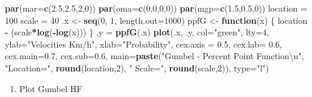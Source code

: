 \documentclass[12pt,twoside]{reedthesis}
\newenvironment{Shaded}{\begin{snugshade}}{\end{snugshade}}
\newcommand{\CharTok}[1]{\textcolor[rgb]{0.31,0.60,0.02}{#1}}
\newcommand{\ControlFlowTok}[1]{\textcolor[rgb]{0.13,0.29,0.53}{\textbf{#1}}}
\newcommand{\DataTypeTok}[1]{\textcolor[rgb]{0.13,0.29,0.53}{#1}}
\newcommand{\DecValTok}[1]{\textcolor[rgb]{0.00,0.00,0.81}{#1}}
\newcommand{\FloatTok}[1]{\textcolor[rgb]{0.00,0.00,0.81}{#1}}
\newcommand{\KeywordTok}[1]{\textcolor[rgb]{0.13,0.29,0.53}{\textbf{#1}}}
\newcommand{\NormalTok}[1]{#1}
\newcommand{\OperatorTok}[1]{\textcolor[rgb]{0.81,0.36,0.00}{\textbf{#1}}}
\newcommand{\StringTok}[1]{\textcolor[rgb]{0.31,0.60,0.02}{#1}}
\providecommand{\tightlist}{%
  \setlength{\itemsep}{0pt}\setlength{\parskip}{0pt}}
\begin{document}
\vspace{0.4cm}
\begin{Shaded}
\begin{Highlighting}[]
\KeywordTok{par}\NormalTok{(}\DataTypeTok{mar=}\KeywordTok{c}\NormalTok{(}\FloatTok{2.5}\NormalTok{,}\FloatTok{2.5}\NormalTok{,}\DecValTok{2}\NormalTok{,}\DecValTok{0}\NormalTok{))}
\KeywordTok{par}\NormalTok{(}\DataTypeTok{oma=}\KeywordTok{c}\NormalTok{(}\DecValTok{0}\NormalTok{,}\DecValTok{0}\NormalTok{,}\DecValTok{0}\NormalTok{,}\DecValTok{0}\NormalTok{))}
\KeywordTok{par}\NormalTok{(}\DataTypeTok{mgp=}\KeywordTok{c}\NormalTok{(}\FloatTok{1.5}\NormalTok{,}\FloatTok{0.5}\NormalTok{,}\DecValTok{0}\NormalTok{))}
\NormalTok{location =}\StringTok{ }\DecValTok{100}
\NormalTok{scale =}\StringTok{ }\DecValTok{40}
\NormalTok{.x <-}\StringTok{ }\KeywordTok{seq}\NormalTok{(}\DecValTok{0}\NormalTok{, }\DecValTok{1}\NormalTok{, }\DataTypeTok{length.out=}\DecValTok{1000}\NormalTok{)}
\NormalTok{ppfG <-}\StringTok{ }\ControlFlowTok{function}\NormalTok{(x) \{}
\NormalTok{  location }\OperatorTok{-}\StringTok{ }\NormalTok{(scale}\OperatorTok{*}\KeywordTok{log}\NormalTok{(}\OperatorTok{-}\KeywordTok{log}\NormalTok{(x)))}
\NormalTok{  \}}
\NormalTok{.y =}\StringTok{ }\KeywordTok{ppfG}\NormalTok{(.x)}
\KeywordTok{plot}\NormalTok{(.x, .y, }\DataTypeTok{col=}\StringTok{"green"}\NormalTok{, }\DataTypeTok{lty=}\DecValTok{4}\NormalTok{, }\DataTypeTok{ylab=}\StringTok{"Velocities Km/h"}\NormalTok{, }\DataTypeTok{xlab=}\StringTok{"Probability"}\NormalTok{, }\DataTypeTok{cex.axis =} \FloatTok{0.5}\NormalTok{, }\DataTypeTok{cex.lab=} \FloatTok{0.6}\NormalTok{, }\DataTypeTok{cex.main=}\FloatTok{0.7}\NormalTok{, }\DataTypeTok{cex.sub=}\FloatTok{0.6}\NormalTok{,}
 \DataTypeTok{main=}\KeywordTok{paste}\NormalTok{(}\StringTok{"Gumbel - Percent Point Function}\CharTok{\textbackslash{}n}\StringTok{"}\NormalTok{, }\StringTok{"Location="}\NormalTok{, }\KeywordTok{round}\NormalTok{(location,}\DecValTok{2}\NormalTok{), }\StringTok{" Scale="}\NormalTok{, }\KeywordTok{round}\NormalTok{(scale,}\DecValTok{2}\NormalTok{)), }\DataTypeTok{type=}\StringTok{"l"}\NormalTok{)}
\end{Highlighting}
\end{Shaded}
\normalsize
\begin{enumerate}
\def\labelenumi{\arabic{enumi}.}
\setcounter{enumi}{4}
\tightlist
\item
  Plot Gumbel HF
\end{enumerate}
\tiny
\end{document}
